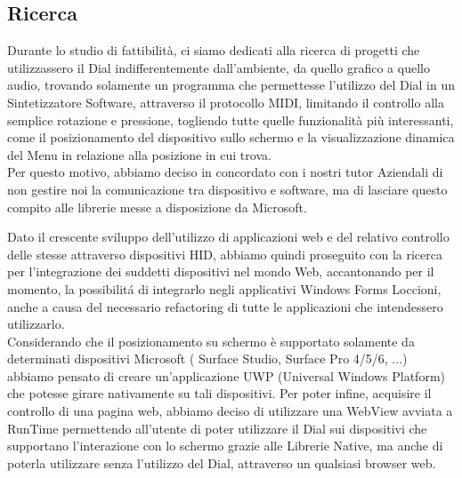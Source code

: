 \subsection{Ricerca}


Durante lo studio di fattibilità, ci siamo dedicati alla ricerca di progetti che utilizzassero il Dial \cite{son} indifferentemente dall’ambiente, da quello grafico a quello audio, trovando solamente un programma che permettesse l'utilizzo del Dial in un Sintetizzatore Software\cite{el}, attraverso il protocollo MIDI, limitando il controllo alla semplice rotazione e pressione, togliendo tutte quelle funzionalità più interessanti, come il posizionamento del dispositivo sullo schermo e la visualizzazione dinamica del Menu in relazione alla posizione in cui trova.\\

Per questo motivo, abbiamo deciso in concordato con i nostri tutor Aziendali di non gestire noi la comunicazione tra dispositivo e software, ma di lasciare questo compito alle librerie messe a disposizione da Microsoft.

Dato il crescente sviluppo dell'utilizzo di applicazioni web e del relativo controllo delle stesse attraverso dispositivi HID, abbiamo quindi proseguito con la ricerca per l'integrazione dei suddetti dispositivi nel mondo Web, accantonando per il momento, la possibilitá di integrarlo negli applicativi Windows Forms Loccioni, anche a causa del necessario refactoring di tutte le applicazioni che intendessero utilizzarlo.\\

Considerando che il posizionamento su schermo è supportato solamente da determinati dispositivi Microsoft ( Surface Studio, Surface Pro 4/5/6, ...) abbiamo pensato di creare un’applicazione UWP (Universal Windows Platform) che potesse girare nativamente su tali dispositivi. Per poter infine, acquisire il controllo di una pagina web, abbiamo deciso di utilizzare una WebView avviata a RunTime permettendo all'utente di poter utilizzare il Dial sui dispositivi che supportano l'interazione con lo schermo grazie alle Librerie Native, ma anche di poterla utilizzare senza l'utilizzo del Dial, attraverso un qualsiasi browser web.

\newpage
